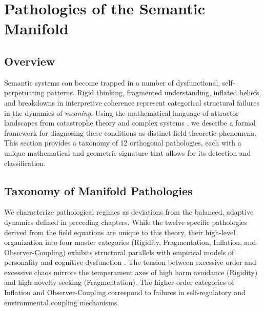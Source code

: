 \chapter{Pathologies of the Semantic Manifold}
\label{16:pathologies_of_the_semantic_manifold}


\section{Overview}
\label{16.1:overview}

Semantic systems can become trapped in a number of dysfunctional, self-perpetuating patterns. Rigid thinking, fragmented understanding, inflated beliefs, and breakdowns in interpretive coherence represent categorical structural failures in the dynamics of \textit{meaning}. Using the mathematical language of attractor landscapes from catastrophe theory and complex systems \autocite{Thom1975, Zeeman1977, Milnor1985}, we describe a formal framework for diagnosing these conditions as distinct field-theoretic phenomena. This section provides a taxonomy of 12 orthogonal pathologies, each with a unique mathematical and geometric signature that allows for its detection and classification.


\section{Taxonomy of Manifold Pathologies}
\label{16.2:taxonomy_of_manifold_pathologies}

We characterize pathological regimes as deviations from the balanced, adaptive dynamics defined in preceding chapters. While the twelve specific pathologies derived from the field equations are unique to this theory, their high-level organization into four master categories (Rigidity, Fragmentation, Inflation, and Observer-Coupling) exhibits structural parallels with empirical models of personality and cognitive dysfunction \autocite{Cloninger1993}. The tension between excessive order and excessive chaos mirrors the temperament axes of high harm avoidance (Rigidity) and high novelty seeking (Fragmentation). The higher-order categories of Inflation and Observer-Coupling correspond to failures in self-regulatory and environmental coupling mechanisms. 

